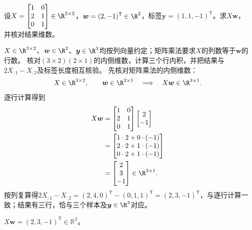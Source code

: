 \begin{example}[三样本数据的类型核对]\label{exm:V1-C01-small}\label{schema:V1-C01:CH-18}\label{schema:V1-C01:CH-32}
设$X=\begin{bmatrix}1&0\\2&1\\0&1\end{bmatrix}\in\R^{3\times2}$，$\boldsymbol{w}=(2,-1)^{\mathsf T}\in\R^2$，标签$\boldsymbol{y}=(1,1,-1)^{\mathsf T}$。求$X\boldsymbol{w}$，并核对结果维数。
\end{example}
\label{schema:V1-C01:CH-33}
\begin{solution}
\SolGiven $X\in\R^{3\times2}$、$\boldsymbol w\in\R^2$、$\boldsymbol y\in\R^3$均按列向量约定；矩阵乘法要求$X$的列数等于$\boldsymbol w$的行数。
\SolPlan 核对$(3\times2)(2\times1)$的内侧维数，计算三个行内积，并把结果与$2X_{:1}-X_{:2}$及标签长度相互核验。
\SolDerive
先核对矩阵乘法的内侧维数：
\[
X\in\R^{3\times2},\qquad
\boldsymbol{w}\in\R^{2\times1}
\quad\Longrightarrow\quad
X\boldsymbol{w}\in\R^{3\times1}.
\]
逐行计算得到
\[
\begin{aligned}
X\boldsymbol{w}
&=
\begin{bmatrix}
1&0\\
2&1\\
0&1
\end{bmatrix}
\begin{bmatrix}
2\\
-1
\end{bmatrix} \\
&=
\begin{bmatrix}
1\cdot2+0\cdot(-1)\\
2\cdot2+1\cdot(-1)\\
0\cdot2+1\cdot(-1)
\end{bmatrix} \\
&=
\begin{bmatrix}
2\\
3\\
-1
\end{bmatrix}
\in\R^{3\times1}.
\end{aligned}
\]
\SolCheck 按列复算得$2X_{:1}-X_{:2}=(2,4,0)^{\mathsf T}-(0,1,1)^{\mathsf T}=(2,3,-1)^{\mathsf T}$，与逐行计算一致；结果有三行，恰与三个样本及$\boldsymbol y\in\R^3$对应。

\SolAnswer $X\boldsymbol w=(2,3,-1)^{\mathsf T}\in\mathbb R^3$。
\end{solution}

